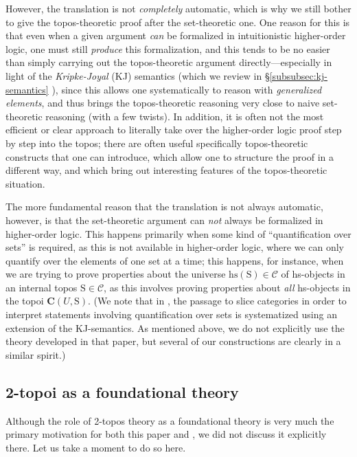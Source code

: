 \documentclass{amsart}
\newcommand\bC{\mathbf{C}}
\newcommand\cC{\mathcal{C}}
\newcommand\hs{\mathrm{hs}}
\newcommand\rS{\mathrm{S}}
\newcommand\prerefpost[3]{%
  \texorpdfstring%
    {\hyperref[#2]{#1\ref*{#2}#3}}%
    {#1\ref*{#2}#3}%
}
\newcommand\sref[1]{\prerefpost{\S}{#1}{}}
\theoremstyle{definition}
\theoremstyle{remark}
\theoremstyle{plainwithref}
\begin{document}
However, the translation is not \emph{completely} automatic, which is why we still bother to give the topos-theoretic proof after the set-theoretic one.
One reason for this is that even when a given argument \emph{can} be formalized in intuitionistic higher-order logic, one must still \emph{produce} this formalization, and this tends to be no easier than simply carrying out the topos-theoretic argument directly---especially in light of the \emph{Kripke-Joyal} (KJ) semantics (which we review in \sref{subsubsec:kj-semantics}), since this allows one systematically to reason with \emph{generalized elements}, and thus brings the topos-theoretic reasoning very close to naive set-theoretic reasoning (with a few twists).
In addition, it is often not the most efficient or clear approach to literally take over the higher-order logic proof step by step into the topos; there are often useful specifically topos-theoretic constructs that one can introduce, which allow one to structure the proof in a different way, and which bring out interesting features of the topos-theoretic situation.

The more fundamental reason that the translation is not always automatic, however, is that the set-theoretic argument can \emph{not} always be formalized in higher-order logic.
This happens primarily when some kind of ``quantification over sets'' is required, as this is not available in higher-order logic, where we can only quantify over the elements of one set at a time; this happens, for instance, when we are trying to prove properties about the universe \( \hs(\rS) \in \cC \) of hs-objects in an internal topos \( \rS \in \cC \), as this involves proving properties about \emph{all} hs-objects in the topoi \( \bC(U, \rS) \).
(We note that in \cite{shulman-stack-semantics}, the passage to slice categories in order to interpret statements involving quantification over sets is systematized using an extension of the KJ-semantics.
As mentioned above, we do not explicitly use the theory developed in that paper, but several of our constructions are clearly in a similar spirit.)

\subsection{2-topoi as a foundational theory} \label{subsec:2-topoi-as-foundation}
Although the role of 2-topos theory as a foundational theory is very much the primary motivation for both this paper and \cite{helfer-topoi-in-topoi}, we did not discuss it explicitly there.
Let us take a moment to do so here.
\end{document}
